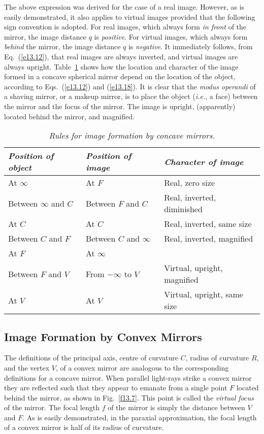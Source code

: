 The above expression was derived for the case of a real
image. However, as is easily demonstrated, it also applies
to virtual images provided that the following sign convention
is adopted. For real images, which always form {\em in front}\/
of the mirror, the image distance $q$ is {\em positive}. For 
virtual images, which always form {\em behind}\/ the mirror,
the image distance $q$ is {\em negative}. It immediately follows,
from Eq.~(\ref{e13.12}), that real images are always inverted, and 
virtual images are always upright. Table~\ref{t13.1}
shows how the location  and character of the image formed
in a concave spherical mirror depend on the location of
the object, according to Eqs.~(\ref{e13.12}) and (\ref{e13.18}). It is
clear that the {\em modus operandi} of a shaving mirror,
or a makeup mirror, is to place the object ({\em i.e.}, a
face) between the mirror and the focus of the mirror. The image
is upright, (apparently) located behind the mirror, and magnified.
\begin{table}\centering
\begin{tabular}{lll}\hline
{\em Position of object} & {\em Position of image} &
{\em Character of image}\\ \hline
At $\infty$ & At $F$ & Real, zero size\\
Between $\infty$ and $C$ & Between $F$ and $C$ &
Real, inverted, diminished\\
At $C$ & At $C$ & Real, inverted, same size \\
Between $C$ and $F$ & Between $C$ and $\infty$ &
Real, inverted, magnified\\
At $F$ & At $\infty$ & \\
Between $F$ and $V$ & From $-\infty$ to $V$ & Virtual,
upright, magnified\\
At $V$ & At $V$ & Virtual, upright, same size\\
\end{tabular}
\caption{\em Rules for image formation by concave mirrors.}\label{t13.1}
\end{table}

\subsection{Image Formation by Convex Mirrors}
The definitions of the principal axis, centre of curvature $C$,
radius of curvature $R$, and the vertex $V$, of a convex mirror
are analogous  to the corresponding definitions
 for a concave mirror.
When parallel light-rays strike a convex mirror they are reflected
such that they appear to emanate from a single point $F$
located behind the mirror, as shown in Fig.~\ref{f13.7}. This point is called the {\em virtual focus}
of the mirror. The focal length
$f$ of the mirror is simply the distance between $V$ and $F$. 
As is easily demonstrated, in the paraxial approximation,  the focal length of a convex mirror
is half of its radius of curvature.

